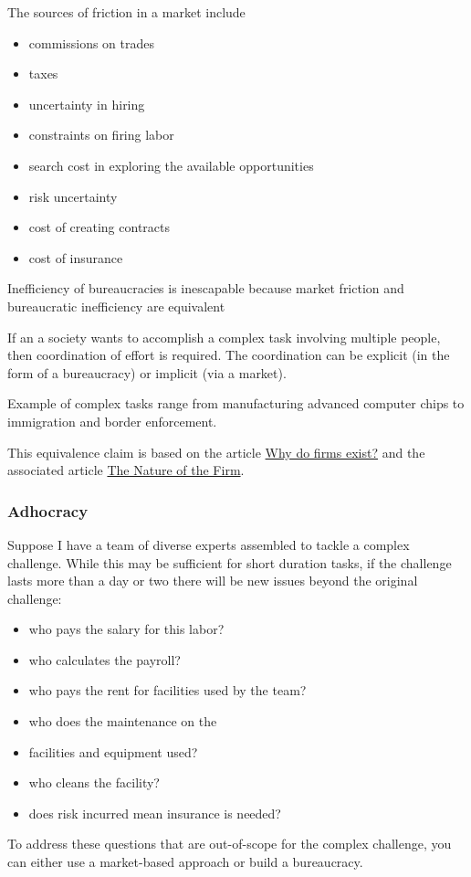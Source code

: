 The sources of friction in a market include
\begin{itemize}
    \item commissions on trades
    \item taxes
    \item uncertainty in hiring
    \item constraints on firing labor
    \item search cost in exploring the available opportunities
    \item risk uncertainty
    \item cost of creating contracts
    \item cost of insurance
\end{itemize}

Inefficiency of bureaucracies is inescapable because market friction and bureaucratic inefficiency are equivalent

If an a society wants to accomplish a complex task involving multiple people, then coordination of effort is required. The coordination can be explicit (in the form of a bureaucracy) or implicit (via a market). 

Example of complex tasks range from manufacturing advanced computer chips to immigration and border enforcement. 

This equivalence claim is based on the article \href{http://www.economist.com/node/17730360}{Why do firms exist?} and the associated article \href{https://en.wikipedia.org/wiki/The_Nature_of_the_Firm}{The Nature of the Firm}.

\cite{2012_Wilson}

\subsubsection{Adhocracy}

Suppose I have a team of diverse experts assembled to tackle a complex challenge.
While this may be sufficient for short duration tasks, if the challenge lasts more than a day or two there will be new issues beyond the original challenge:

\begin{itemize}
    \item who pays the salary for this labor?
    \item who calculates the payroll?
    \item who pays the rent for facilities used by the team?
    \item who does the maintenance on the     \item facilities and equipment used?
    \item who cleans the facility?
    \item does risk incurred mean insurance is needed?
\end{itemize}
To address these questions that are out-of-scope for the complex challenge, you can either use a market-based approach or build a bureaucracy. 

